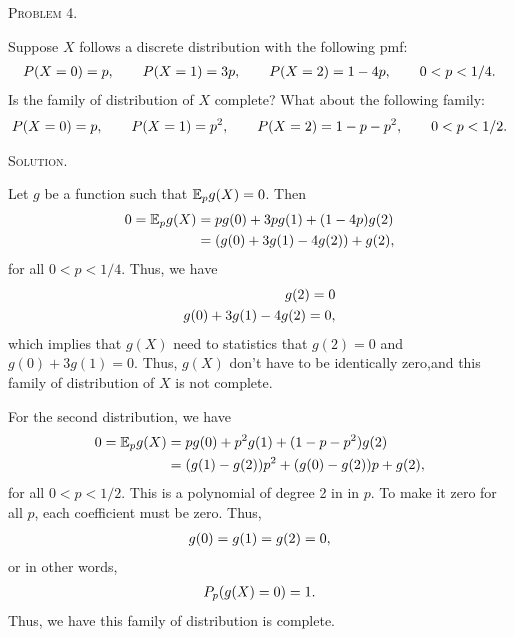 \documentclass{article}
\begin{document}
\begin{CJK}{UTF8}{gbsn}
    \begin{shaded}
        \noindent\textsc{Problem 4.}\par
        Suppose $X$ follows a discrete distribution with the following pmf:
        \begin{align}
            P(X=0) = p,\qquad P(X=1)=3p,\qquad P(X=2) =  1-4p,\qquad 0<p<1/4.\notag
        \end{align}
        Is the family of distribution of $X$ complete? What about the following family:
        \begin{align}
            P(X=0)=p,\qquad P(X=1)=p^2,\qquad P(X=2)=1-p-p^2,\qquad 0<p<1/2.\notag
        \end{align}
    \end{shaded}
    \noindent\textsc{Solution.}\par
    Let $g$ be a function such that ${\mathbb E}_p g(X)=0$.
    Then
    \begin{align}
        0 = {\mathbb E}_p g(X) & = pg(0) + 3pg(1) + (1-4p) g(2) \notag  \\
                       & = (g(0) + 3g(1) - 4g(2)) + g(2),\notag
    \end{align}
    for all $0< p < 1/4$.
    Thus, we have
    \begin{align}
        g(2) = 0\notag \\
        g(0) + 3g(1) - 4g(2) = 0,\notag
    \end{align}
    which implies that $g(X)$ need to statistics that $g(2)=0$ and $g(0) + 3g(1) = 0$.
    Thus, $g(X)$ don't have to be identically zero,and this family of distribution of $X$ is not complete.

    For the second distribution, we have
    \begin{align}
        0 = {\mathbb E}_pg(X) & = pg(0) + p^2 g(1) + (1-p-p^2) g(2) \notag         \\
                      & = (g(1)-g(2)) p^2 + (g(0) - g(2)) p + g(2), \notag
    \end{align}
    for all $0< p < 1/2$.
    This is a polynomial of degree 2 in in $p$. To make it zero for all $p$, each coefficient must be zero.
    Thus,
    \begin{align}
        g(0) = g(1) = g(2) =0,\notag
    \end{align}
    or in other words,
    \begin{align}
        P_p(g(X)=0)=1.\notag
    \end{align}
    Thus, we have this family  of distribution is complete.
\end{CJK}
\end{document}

